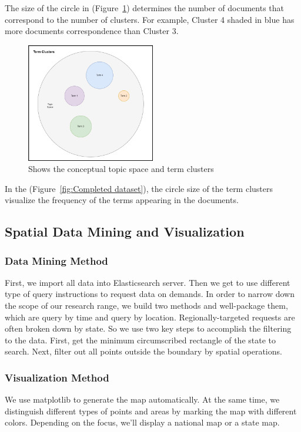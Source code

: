 The size of the circle in (Figure~\ref{fig:Shows the conceptual2}) determines
the number of documents that correspond to the number of clusters. For
example, Cluster 4 shaded in blue has more documents correspondence than
Cluster 3.
\begin{figure}[H]
\centering
\includegraphics[width=0.5\textwidth]{imgs/term_clusters.png}
\caption{ Shows the conceptual topic space and term clusters}
\label{fig:Shows the conceptual2}
\end{figure}
In the (Figure~\ref{fig:Completed dataset}), the circle size of the term
clusters visualize the frequency of the terms appearing in the documents.

\subsection{Spatial Data Mining and Visualization}
\subsubsection{Data Mining Method}
First, we import all data into Elasticsearch server. Then we get to use
different type of query instructions to request data on demands. In order to
narrow down the scope of our research range, we build two methods and
well-package them, which are query by time and query by location.
Regionally-targeted requests are often broken down by state. So we use two
key steps to accomplish the filtering to the data. First, get the minimum
circumscribed rectangle of the state to search. Next, filter out all points
outside  the boundary by spatial operations. 

\subsubsection{Visualization Method}
We use matplotlib to generate the map automatically. At the same time, we
distinguish different types of points and areas by marking the map with
different colors. Depending on the focus, we'll display a national map or a
state map.
